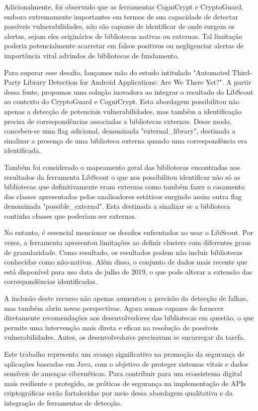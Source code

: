 Adicionalmente, foi observado que as ferramentas CogniCrypt e CryptoGuard, embora extremamente importantes em termos de sua capacidade de detectar possíveis vulnerabilidades, não são capazes de identificar de onde surgem os alertas, sejam eles originários de bibliotecas nativas ou externas. Tal limitação poderia potencialmente acarretar em falsos positivos ou negligenciar alertas de importância vital advindos de bibliotecas de fundamento.

Para superar esse desafio, lançamos mão do estudo  intitulado "Automated Third-Party Library Detection for Android Applications: Are We There Yet?". A partir dessa fonte, propomos uma solução inovadora ao integrar o resultado do LibScout ao contexto do CryptoGuard e CogniCrypt. Esta abordagem possibilitou não apenas a detecção de potenciais vulnerabilidades, mas também a identificação precisa de correspondências associadas a bibliotecas externas. Desse modo, concebeu-se uma flag adicional, denominada "external\_library", destinada a sinalizar a presença de uma biblioteca externa quando uma correspondência era identificada.

Também foi considerado o mapeamento geral das bibliotecas encontradas nos resultados da ferramenta LibScout o que nos possibilitou identificar não só as bibliotecas que definitivamente eram externas como também fazer o casamento das classes apresentadas pelos analisadores estáticos surgindo assim outra flag denominada "possible\_external". Esta destinada a sinalizar se a biblioteca continha classes que poderiam ser externas. 

No entanto, é essencial mencionar os desafios enfrentados ao usar o LibScout. Por vezes, a ferramenta apresentou limitações ao definir clusters com diferentes graus de granularidade. Como resultado, os resultados podem não incluir bibliotecas conhecidas como não-nativas. Além disso, o conjunto de dados mais recente que está disponível para uso data de julho de 2019, o que pode alterar a extensão das correspondências identificadas.

A inclusão deste recurso não apenas aumentou a precisão da detecção de falhas, mas também abriu novas perspectivas. Agora somos capazes de fornecer diretamente recomendações aos desenvolvedores das bibliotecas em questão, o que permite uma intervenção mais direta e eficaz na resolução de possíveis vulnerabilidades. Antes, os desenvolvedores precisavam se encarregar da tarefa.

Este trabalho representa um avanço significativo na promoção da segurança de aplicações baseadas em Java, com o objetivo de proteger sistemas vitais e dados sensíveis de ameaças cibernéticas. Para contribuir para um ecossistema digital mais resiliente e protegido, as práticas de segurança na implementação de APIs criptográficas serão fortalecidas por meio dessa abordagem qualitativa e da integração de ferramentas de detecção.

